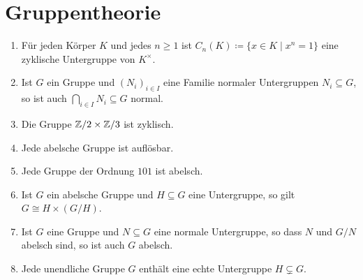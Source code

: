 \section{Gruppentheorie}


\begin{question}[subtitle = Wahr oder Falsch?]
  \begin{enumerate}
    \item
      Für jeden Körper $K$ und jedes $n \geq 1$ ist $C_n(K) \coloneqq \{x \in K \mid x^n = 1\}$ eine zyklische Untergruppe von $K^\times$.
    \item
      Ist $G$ ein Gruppe und $(N_i)_{i \in I}$ eine Familie normaler Untergruppen $N_i \subseteq G$, so ist auch $\bigcap_{i \in I} N_i \subseteq G$ normal.
    \item
      Die Gruppe $\mathbb{Z}/2 \times \mathbb{Z}/3$ ist zyklisch.
    \item
      Jede abelsche Gruppe ist auflösbar.
    \item
      Jede Gruppe der Ordnung $101$ ist abelsch.
    \item
      Ist $G$ ein abelsche Gruppe und $H \subseteq G$ eine Untergruppe, so gilt $G \cong H \times (G/H)$.
    \item
      Ist $G$ eine Gruppe und $N \subseteq G$ eine normale Untergruppe, so dass $N$ und $G/N$ abelsch sind, so ist auch $G$ abelsch.
    \item
      Jede unendliche Gruppe $G$ enthält eine echte Untergruppe $H \subsetneq G$.
  \end{enumerate}
\end{question}



